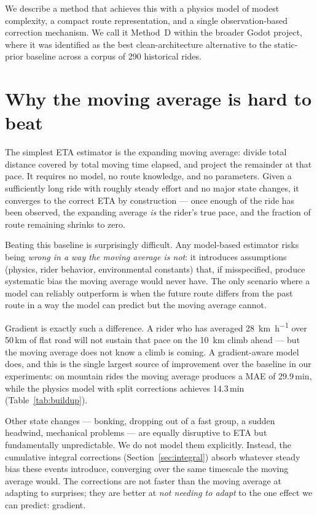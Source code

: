 \documentclass[11pt,a4paper]{article}
\begin{document}
We describe a method that achieves this with a physics model of
modest complexity, a compact route representation, and a single
observation-based correction mechanism. We call it Method~D within
the broader Godot project, where it was identified as the best
clean-architecture alternative to the static-prior baseline across a
corpus of 290 historical rides.


\section{Why the moving average is hard to beat}
\label{sec:baseline}

The simplest ETA estimator is the expanding moving average: divide
total distance covered by total moving time elapsed, and project the
remainder at that pace. It requires no model, no route knowledge, and
no parameters. Given a sufficiently long ride with roughly steady
effort and no major state changes, it converges to the correct ETA by
construction --- once enough of the ride has been observed, the
expanding average \emph{is} the rider's true pace, and the fraction
of route remaining shrinks to zero.

Beating this baseline is surprisingly difficult. Any model-based
estimator risks being \emph{wrong in a way the moving average is
not}: it introduces assumptions (physics, rider behavior,
environmental constants) that, if misspecified, produce systematic
bias the moving average would never have. The only scenario where a
model can reliably outperform is when the future route differs from
the past route in a way the model can predict but the moving average
cannot.

Gradient is exactly such a difference. A rider who has averaged
\SI{28}{\km\per\hour} over 50\,\si{\km} of flat road will not
sustain that pace on the \SI{10}{\km} climb ahead --- but the moving
average does not know a climb is coming. A gradient-aware model does,
and this is the single largest source of improvement over the baseline
in our experiments: on mountain rides the moving average produces a
MAE of 29.9\,\si{\minute}, while the physics model with split
corrections achieves 14.3\,\si{\minute} (Table~\ref{tab:buildup}).

Other state changes --- bonking, dropping out of a fast group, a
sudden headwind, mechanical problems --- are equally disruptive to
ETA but fundamentally unpredictable. We do not model them explicitly.
Instead, the cumulative integral corrections
(Section~\ref{sec:integral}) absorb whatever steady bias these events
introduce, converging over the same timescale the moving average
would. The corrections are not faster than the moving average at
adapting to surprises; they are better at \emph{not needing to adapt}
to the one effect we can predict: gradient.
\end{document}
